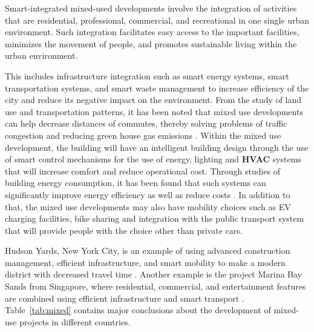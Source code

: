 \documentclass[pdflatex,sn-mathphys-num]{sn-jnl}%
\theoremstyle{thmstyleone}%
\theoremstyle{thmstyletwo}%
\theoremstyle{thmstylethree}%
\begin{document}
Smart-integrated mixed-used developments involve the integration of activities that are residential, professional, commercial, and recreational in one single urban environment. Such integration facilitates easy access to the important facilities, minimizes the movement of people, and promotes sustainable living within the urban environment.

This includes infrastructure integration such as smart energy systems, smart transportation systems, and smart waste management to increase efficiency of the city and reduce its negative impact on the environment. From the study of land use and transportation patterns, it has been noted that mixed use developments can help decrease distances of commutes, thereby solving problems of traffic congestion and reducing green house gas emissions \cite{r58}. Within the mixed use development, the building will have an intelligent building design through the use of smart control mechanisms for the use of energy, lighting and \textbf{HVAC} systems that will increase comfort and reduce operational cost. Through studies of building energy consumption, it has been found that such systems can significantly improve energy efficiency as well as reduce costs \cite{r59}. In addition to that, the mixed use developments may also have mobility choices such as EV charging facilities, bike sharing and integration with the public transport system that will provide people with the choice other than private cars.

Hudson Yards, New York City, is an example of using advanced construction management, efficient infrastructure, and smart mobility to make a modern district with decreased travel time \cite{r61}. Another example is the project Marina Bay Sands from Singapore, where residential, commercial, and entertainment features are combined using efficient infrastructure and smart transport \cite{r62}. Table~\ref{tab:mixed} contains major conclusions about the development of mixed-use projects in different countries.
\end{document}
